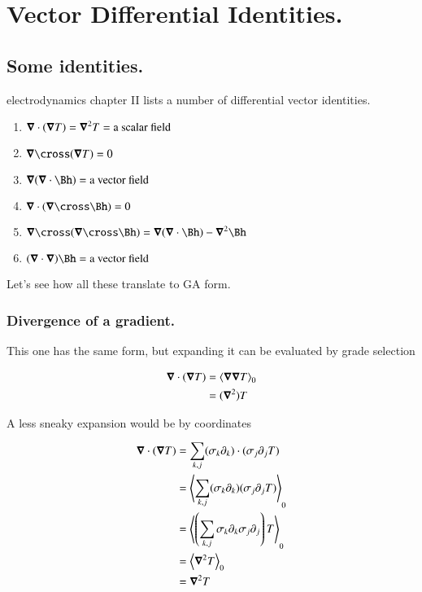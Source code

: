 \chapter{Vector Differential Identities.}
\date{ Jan 05, 2009.  Last Revision: $Date: 2009/06/04 13:13:27 $ }

\section{Some identities. }

\cite{feynman1963flp} electrodynamics chapter II lists a number of
differential vector identities.

\begin{enumerate}
\item $\boldsymbol{\nabla} \cdot (\boldsymbol{\nabla} T) = \boldsymbol{\nabla}^2 T = \mbox{a scalar field}$
\item $\spacegrad \cross (\spacegrad T) = 0$
\item $\spacegrad (\spacegrad \cdot \Bh) = \mbox{a vector field}$
\item $\spacegrad \cdot (\spacegrad \cross \Bh) = 0$
\item $\spacegrad \cross (\spacegrad \cross \Bh) = \spacegrad(\spacegrad \cdot \Bh) - \spacegrad^2 \Bh$
\item $(\spacegrad \cdot \spacegrad) \Bh = \mbox{a vector field}$
\end{enumerate}

Let's see how all these translate to GA form.

\subsection{Divergence of a gradient. }

This one has the same form, but expanding it can be evaluated by grade
selection

\begin{align*}
\boldsymbol{\nabla} \cdot (\boldsymbol{\nabla} T) 
&= {\left\langle{{\boldsymbol{\nabla}\boldsymbol{\nabla}T}}\right\rangle}_{0} \\
&= (\boldsymbol{\nabla}^2) T
\end{align*}

A less sneaky expansion would be by coordinates

\begin{align*}
\boldsymbol{\nabla} \cdot (\boldsymbol{\nabla} T) 
&= {\sum_{k,j} (\sigma_k \partial_k) \cdot (\sigma_j \partial_j T)} \\
&= {\left\langle{{\sum_{k,j} (\sigma_k \partial_k) (\sigma_j \partial_j T)}}\right\rangle}_{0} \\
&= {\left\langle{{\left(\sum_{k,j} \sigma_k \partial_k \sigma_j \partial_j\right) T}}\right\rangle}_{0} \\
&= {\left\langle{{\boldsymbol{\nabla}^2 T}}\right\rangle}_{0} \\
&= \boldsymbol{\nabla}^2 T \\
\end{align*}

